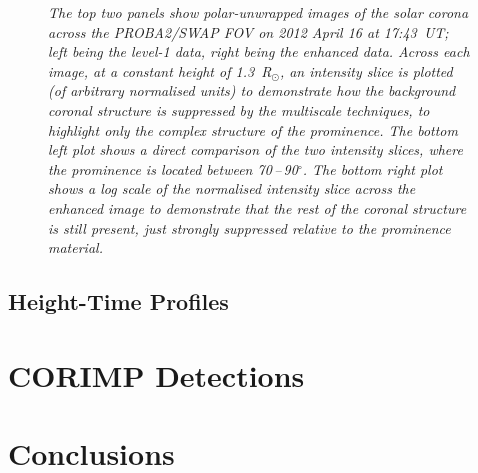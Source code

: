 \documentclass[preprint2]{aastex}
\begin{document}
\begin{figure}[h]
\caption{\itshape The top two panels show polar-unwrapped images of the solar corona across the PROBA2/SWAP FOV on 2012 April 16 at 17:43~UT; left being the level-1 data, right being the enhanced data. Across each image, at a constant height of 1.3~R$_\odot$, an intensity slice is plotted (of arbitrary normalised units) to demonstrate how the background coronal structure is suppressed by the multiscale techniques, to highlight only the complex structure of the prominence. The bottom left plot shows a direct comparison of the two intensity slices, where the prominence is located between 70\,--\,90$^\circ$. The bottom right plot shows a log scale of the normalised intensity slice across the enhanced image to demonstrate that the rest of the coronal structure is still present, just strongly suppressed relative to the prominence material.}
\label{combine_polar_figs}
\end{figure}


\subsection{Height-Time Profiles}



\section{CORIMP Detections}


\section{Conclusions}
\label{sect_conclusions}
\end{document}
